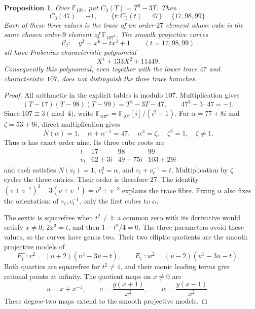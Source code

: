 \documentclass[11pt]{article}
\newtheorem{proposition}[theorem]{Proposition}
\theoremstyle{definition}
\theoremstyle{remark}
\begin{document}
\begin{proposition}\label{prop:genus-two-trace-collision}
Over \(\mathbb F_{107}\), put \(C_3(T)=T^3-3T\). Then
\[
 C_3(47)=-1,\qquad
 \{t:C_3(t)=47\}=\{17,98,99\}.
\]
Each of these three values is the trace of an order-\(27\) element
whose cube is the same chosen order-\(9\) element of
\(\mathbb F_{107^2}\). The smooth projective curves
\[
 \mathcal C_t:\quad y^2=x^6-tx^3+1
 \qquad(t=17,98,99)
\]
all have Frobenius characteristic polynomial
\[
                 X^4+133X^2+11449.
\]
Consequently this polynomial, even together with the lower trace
\(47\) and characteristic \(107\), does not distinguish the three
trace branches.
\end{proposition}
\begin{proof}
All arithmetic in the explicit tables is modulo \(107\).
Multiplication gives
\[
 (T-17)(T-98)(T-99)=T^3-3T-47,
 \qquad 47^3-3\cdot47=-1.
\]
Since \(107\equiv3\pmod4\), write
\(\mathbb F_{107^2}=\mathbb F_{107}[i]/(i^2+1)\).
For \(\alpha=77+8i\) and \(\zeta=53+9i\), direct multiplication gives
\[
 N(\alpha)=1,\quad \alpha+\alpha^{-1}=47,\quad
 \alpha^3=\zeta,\quad \zeta^3=1,\quad \zeta\ne1.
\]
Thus \(\alpha\) has exact order nine. Its three cube roots are
\[
 \begin{array}{c|ccc}
 t&17&98&99\\ \hline
 v_t&62+3i&49+75i&103+29i
 \end{array}
\]
and each satisfies \(N(v_t)=1\), \(v_t^3=\alpha\), and
\(v_t+v_t^{-1}=t\). Multiplication by \(\zeta\) cycles the three
entries. Their order is therefore \(27\). The identity
\((v+v^{-1})^3-3(v+v^{-1})=v^3+v^{-3}\) explains the trace fibre.
Fixing \(\alpha\) also fixes the orientation: of
\(v_t,v_t^{-1}\), only the first cubes to \(\alpha\).

The sextic is squarefree when \(t^2\ne4\): a common zero with its
derivative would satisfy \(x\ne0\), \(2x^3=t\), and then
\(1-t^2/4=0\). The three parameters avoid these values, so the
curves have genus two. Their two elliptic quotients are the smooth
projective models of
\[
 E_t^+:v^2=(u+2)(u^3-3u-t),\qquad
 E_t^-:w^2=(u-2)(u^3-3u-t).
\]
Both quartics are squarefree for \(t^2\ne4\), and their monic
leading terms give rational points at infinity. The quotient maps
on \(x\ne0\) are
\[
 u=x+x^{-1},\qquad
 v=\frac{y(x+1)}{x^2},\qquad
 w=\frac{y(x-1)}{x^2}.
\]
These degree-two maps extend to the smooth projective models.


\end{proof}
\end{document}
